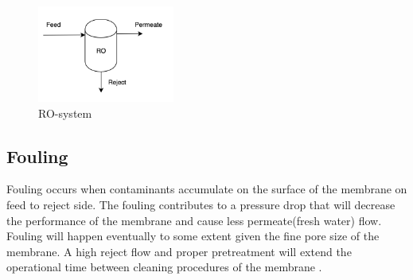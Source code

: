 \begin{figure}[h]
    \centering
    \includegraphics[width=0.4\textwidth]{ROsystem}
    \caption{RO-system}
    \label{fig:ROsystem}
\end{figure}





\subsection{Fouling}
Fouling occurs when contaminants accumulate on the surface of the membrane on feed to reject side. The fouling contributes to a pressure drop that will decrease the performance of the membrane and cause less permeate(fresh water) flow. Fouling will happen eventually to some extent given the fine pore size of the membrane. A high reject flow and proper pretreatment will extend the operational time between cleaning procedures of the membrane \cite{Puretech}. 

